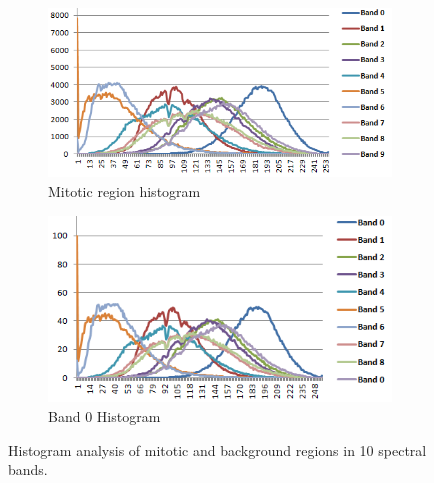 \documentclass[10pt,twocolumn,letterpaper]{article}
\begin{document}
\begin{figure}[t]
	\centering
	\begin{subfigure}[b]{0.22\textwidth}
		\includegraphics[width=\textwidth]{diagrams/AllBandsHistrogramActual.png}
		\caption*{Mitotic region histogram}
	\end{subfigure}
	\begin{subfigure}[b]{0.22\textwidth}
		\includegraphics[width=\textwidth]{diagrams/AllBandsHistrogram.png}
		\caption*{Band 0 Histogram}
	\end{subfigure}
	\caption{Histogram analysis of mitotic and background regions in 10 spectral bands.}
	\label{fig:bands_histogram}	
\end{figure}
\end{document}
